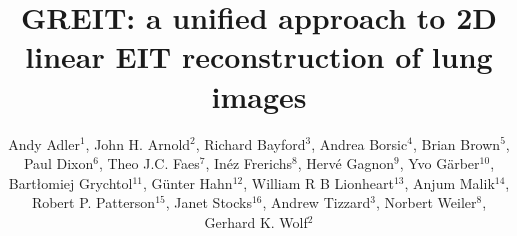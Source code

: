 \documentclass[12pt]{iopart}
\begin{document}
\title[GREIT: linear EIT image reconstruction]{%
GREIT: a unified approach to 2D linear EIT reconstruction of
       lung images
}

\author{Andy Adler$^{1}$,
        John H. Arnold$^{2}$,
        Richard Bayford$^{3}$,
        Andrea Borsic$^{4}$,
        Brian Brown$^{5}$,
        Paul Dixon$^{6}$,
        Theo J.C. Faes$^{7}$,
        In\'ez Frerichs$^{8}$,
        Herv\'e Gagnon$^{9}$,
        Yvo G\"arber$^{10}$,
        Bart\l{}omiej Grychtol$^{11}$, 
        G\"unter Hahn$^{12}$,
        William R B Lionheart$^{13}$,
        Anjum Malik$^{14}$,
        Robert P. Patterson$^{15}$,
        Janet Stocks$^{16}$,
        Andrew Tizzard$^{3}$,
        Norbert Weiler$^{8}$,
        Gerhard K. Wolf$^{2}$%
       }

\address{ $^{1}$Systems and Computer Engineering,
                Carleton University, Ottawa, Canada}
\address{ $^{2}$Division of Critical Care Medicine, Department of Anesthesia,
                Children's Hospital Boston, Harvard Medical School,
                Boston, MA, USA}
\address{ $^{3}$Department of Natural Sciences,
                Middlesex University, London, UK}
\address{ $^{4}$School of Engineering, 
                Dartmouth College, Hanover, NH, USA}
\address{ $^{5}$Medical Physics, University of Sheffield, UK}
\address{ $^{6}$Cardinal Health Care, London, UK}
\address{ $^{7}$Department of Physics and Medical Technology,
                V.U. university medical center, Amsterdam, Netherlands}
\address{ $^{8}$Department of Anaesthesiology and Intensive Care Medicine,
                University of Schleswig-Holstein, Kiel, Germany}
\address{ $^{9}$D\'epartement de g\'enie \'electrique,
                \'Ecole Polytechnique de Montr\'eal, Canada}
\address{$^{10}$Dr\"ager Medical, L\"ubeck, Germany}
\address{$^{11}$University of Strathclyde, Glasgow, UK}
\address{$^{12}$Department of Anaesthesiological Research,
                University of G\"ottingen, Germany}
\address{$^{13}$School of Mathematics, University of Manchester, UK}
\address{$^{14}$Maltron International, Rayleigh, UK}
\address{$^{15}$Department of Biomedical Engineering,
                University of Minnesota, Minneapolis, MN, USA}
\address{$^{16}$Institute of Child Health,
                University College London, UK}
\end{document}
